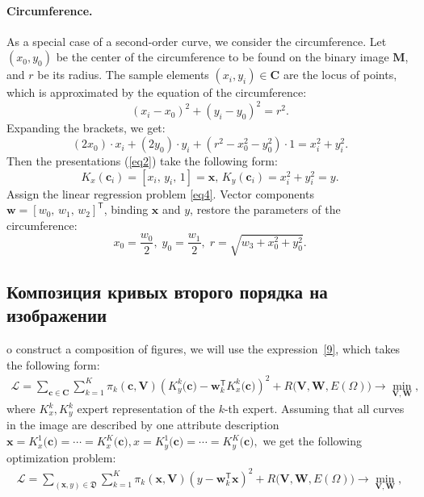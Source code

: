 \paragraph{ Circumference.} As a special case of a second-order curve, we consider the circumference.
Let $(x_0, y_0)$ be the center of the circumference to be found on the binary image $\mathbf {M} $, and $r$ be its radius.
The sample elements $(x_i, y_i) \in \mathbf {C}$ are the locus of points, which is approximated by the equation of the circumference:
\[
(x_i - x_0)^2 + (y_i - y_0)^2 = r^2.
\]
Expanding the brackets, we get:
\[(2x_0)\cdot x_i + (2y_0)\cdot y_i + (r^2 - x_0^2 - y_0^2)\cdot 1 = x_i^2 + y_i^2 . 
\]
Then the presentations (\ref{eq2}) take the following form:
\[
\label{10}
K_{x}(\mathbf{c}_i) = [x_i, \, y_i, \, 1] = \mathbf{x}, \,  K_{y}(\mathbf{c}_i) = x_i^2+y_i^2 = y.
\] 
Assign the linear regression problem \eqref{eq4}.
Vector components $\mathbf{w} = [w_0, \, w_1, \, w_2]^\mathsf{T}$, binding $\mathbf{x}$ and $y$, restore the parameters of the circumference: \[ x_0 = \frac{w_0}{2}, \; y_0 = \frac{w_1}{2}, \; r = \sqrt{w_3 + x_0^2 + y_0 ^2}.\]

\subsection{Композиция кривых второго порядка на изображении}
\label{sec:4}
o construct a composition of figures, we will use the expression~\eqref{9}, which takes the following form:
\[ 
\label{statment:optim:task}
\begin{aligned}
\mathcal{L} = \sum\limits_{\mathbf{c} \in \mathbf{C}} \sum\limits_{k = 1}^{K} \pi_k(\mathbf{c}, \mathbf{V})\left(K^{k}_y\bigr(\mathbf{c}\bigr) - \mathbf{w}_k^{\mathsf{T}}K^{k}_x\bigr(\mathbf{c}\bigr)\right)^2 + R\bigl(\mathbf{V}, \mathbf{W}, E(\Omega)\bigr) \rightarrow \min_{\mathbf{V}, \mathbf{W}},
\end{aligned}
\] 
where $K^{k}_x, K^{k}_y$ expert representation of the $k$-th expert. Assuming that all curves in the image are described by one attribute description $\mathbf {x} =K^{1}_x\bigr(\mathbf{c}\bigr)=\cdots=K^{K}_x\bigr(\mathbf{c}\bigr), x= K^{1}_y\bigr(\mathbf{c}\bigr)=\cdots=K^{K}_y\bigr(\mathbf{c}\bigr),$ we get the following optimization problem:
\[ 
\label{statment:optim:task:simp}
\begin{aligned}
\mathcal{L} = \sum\limits_{\left(\mathbf{x}, y\right) \in \mathfrak{D}} \sum\limits_{k = 1}^{K} \pi_k(\mathbf{x}, \mathbf{V})\left(y - \mathbf{w}_k^{\mathsf{T}}\mathbf{x}\right)^2 + R\bigl(\mathbf{V}, \mathbf{W}, E(\Omega)\bigr) \rightarrow \min_{\mathbf{V}, \mathbf{W}},
\end{aligned}
\] 

